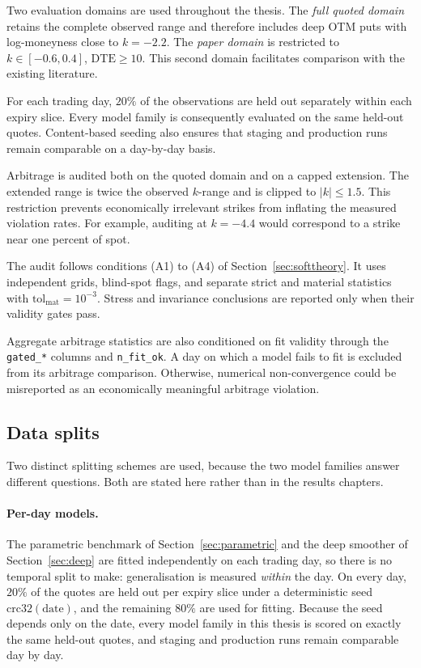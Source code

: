 Two evaluation domains are used throughout the thesis. The \emph{full quoted domain} retains
the complete observed range and therefore includes deep OTM puts with log-moneyness close to
$k=-2.2$. The \emph{paper domain} is restricted to
$k\in[-0.6,0.4]$, $\mathrm{DTE}\ge10.$
This second domain facilitates comparison with the existing literature.

For each trading day, $20\%$ of the observations are held out separately within each expiry
slice. 
Every model family is consequently evaluated on the same held-out quotes. Content-based seeding
also ensures that staging and production runs remain comparable on a day-by-day basis.

Arbitrage is audited both on the quoted domain and on a capped extension. The extended range is
twice the observed $k$-range and is clipped to $|k|\le1.5.$
This restriction prevents economically irrelevant strikes from inflating the measured
violation rates. For example, auditing at $k=-4.4$ would correspond to a strike near one percent
of spot.

The audit follows conditions (A1) to (A4) of Section~\ref{sec:softtheory}. It uses independent
grids, blind-spot flags, and separate strict and material statistics with $\mathrm{tol}_{\mathrm{mat}}=10^{-3}.$
Stress and invariance conclusions are reported only when their validity gates pass.

Aggregate arbitrage statistics are also conditioned on fit validity through the
\texttt{gated\_*} columns and \texttt{n\_fit\_ok}. A day on which a model fails to fit is
excluded from its arbitrage comparison. Otherwise, numerical non-convergence could be
misreported as an economically meaningful arbitrage violation.

\subsection{Data splits}\label{sec:splits}

Two distinct splitting schemes are used, because the two model families answer different
questions. Both are stated here rather than in the results chapters.

\paragraph{Per-day models.} The parametric benchmark of Section~\ref{sec:parametric} and the
deep smoother of Section~\ref{sec:deep} are fitted independently on each trading day, so there
is no temporal split to make: generalisation is measured \emph{within} the day. On every day,
$20\%$ of the quotes are held out per expiry slice under a deterministic seed
$\mathrm{crc32}(\text{date})$, and the remaining $80\%$ are used for fitting. Because the seed
depends only on the date, every model family in this thesis is scored on exactly the same
held-out quotes, and staging and production runs remain comparable day by day.

